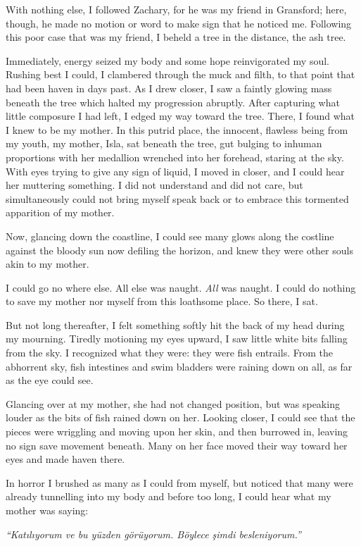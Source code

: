 With nothing else, I followed Zachary, for he was my friend in Gransford; here, though, he made no
motion or word to make sign that he noticed me. Following this poor case that was my friend, I
beheld a tree in the distance, the ash tree.

Immediately, energy seized my body and some hope reinvigorated my soul. Rushing best I could, I
clambered through the muck and filth, to that point that had been haven in days past. As I drew
closer, I saw a faintly glowing mass beneath the tree which halted my progression abruptly. After
capturing what little composure I had left, I edged my way toward the tree. There, I found what I
knew to be my mother. In this putrid place, the innocent, flawless being from my youth, my mother,
Isla, sat beneath the tree, gut bulging to inhuman proportions with her medallion wrenched into her
forehead, staring at the sky. With eyes trying to give any sign of liquid, I moved in closer, and I
could hear her muttering something. I did not understand and did not care, but simultaneously could
not bring myself speak back or to embrace this tormented apparition of my mother.

Now, glancing down the coastline, I could see many glows along the costline against the bloody sun
now defiling the horizon, and knew they were other souls akin to my mother.

I could go no where else. All else was naught. \textit{All} was naught. I could do nothing to save
my mother nor myself from this loathsome place. So there, I sat.

But not long thereafter, I felt something softly hit the back of my head during my mourning. Tiredly
motioning my eyes upward, I saw little white bits falling from the sky. I recognized what they were:
they were fish entrails. From the abhorrent sky, fish intestines and swim bladders were raining down
on all, as far as the eye could see.

Glancing over at my mother, she had not changed position, but was speaking louder as the bits of
fish rained down on her. Looking closer, I could see that the pieces were wriggling and moving upon
her skin, and then burrowed in, leaving no sign save movement beneath. Many on her face moved their
way toward her eyes and made haven there.

In horror I brushed as many as I could from myself, but noticed that many were already tunnelling
into my body and before too long, I could hear what my mother was saying:

\vspace{5mm}
\textit{``Katılıyorum ve bu yüzden görüyorum. Böylece şimdi besleniyorum.''}
\vspace{5mm}

